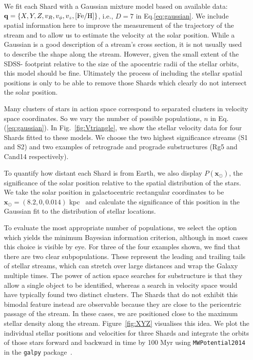 \documentclass[prd,10pt,twocolumn,showpacs,nofootinbib,aps,superscriptaddress,preprintnumbers]{revtex4-1}
\newcommand{\Gaia}{\!{\it Gaia}\xspace}
\begin{document}
 
 
 
 We fit each Shard with a Gaussian mixture model based on available data: 
 $\mathbf{q} = \{X,Y,Z,v_R,v_\phi,v_z,[{\rm Fe/H}]\}$, i.e.,
 $D=7$ in Eq.\eqref{eq:gaussian}. We include spatial information here
 to improve the measurement of the trajectory of the stream and to
 allow us to estimate the velocity at the solar position. While a
 Gaussian is a good description of a stream's cross section, it is
 not usually used to describe the shape along the stream. 
 However, given the small extent of the SDSS-\Gaia
 footprint relative to the size of the apocentric radii of the stellar
 orbits, this model should be fine. Ultimately the process of including the stellar spatial positions is only to be able to remove those Shards which clearly do not intersect the solar position.
 
 Many clusters of stars in action space correspond to separated
 clusters in velocity space coordinates. So we vary the number of
 possible populations, $n$ in Eq.(\ref{eq:gaussian}). In
 Fig.~\ref{fig:Vtriangle}, we show the stellar velocity data for four Shards fitted to these models. We choose the two highest
 significance streams (S1 and S2) and two examples of retrograde and
 prograde substructures (Rg5 and Cand14 respectively). 
 
 To quantify how distant each Shard is from Earth, we also display $P(\mathbf{x}_\odot)$, the
 significance of the solar position relative to the spatial
 distribution of the stars. We take the solar position in
 galactocentric rectangular coordinates to be $\mathbf{x}_\odot = (8.2,
 0, 0.014)$ kpc~\cite{Binney:1997,McMillan:2017,2019arXiv190405721A}
 and calculate the significance of this position in the Gaussian fit to
 the distribution of stellar locations.
 
 To evaluate the most appropriate number of populations, we select
 the option which yields the minimum Bayesian information criterion,
 although in most cases this choice is visible by eye. For three of the
 four examples shown, we find that there are two clear
 subpopulations. These represent the leading and trailing tails of
 stellar streams, which can stretch over large distances and wrap the
 Galaxy multiple times.  The power of action
 space searches for substructure is that they allow a single object to be identified, whereas a
 search in velocity space would have typically found two distinct
 clusters. The Shards that do not exhibit this bimodal feature instead
 are observable because they are close to the pericentric passage of
 the stream. In these cases, we are positioned close to the maximum
 stellar density along the stream. Figure~\ref{fig:XYZ} visualises this idea. We plot the individual stellar positions and
 velocities for three Shards and integrate the orbits of those stars forward and backward
 in time by 100 Myr using {\tt MWPotential2014} in the \texttt{galpy} package~\cite{Bovy:galpy}.
 
\end{document}
